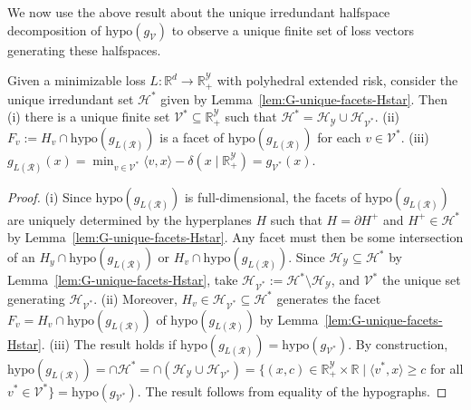 \documentclass[twoside,11pt]{article}
\newcommand{\Comments}{1}
\newcommand{\mynote}[2]{\ifnum\Comments=1\textcolor{#1}{#2}\fi}
\newcommand{\raf}[1]{\mynote{darkgreen}{[RF: #1]}}
\newcommand{\reals}{\mathbb{R}}
\renewcommand{\H}{\mathcal{H}}
\newcommand{\R}{\mathcal{R}}
\newcommand{\V}{\mathcal{V}}
\newcommand{\Y}{\mathcal{Y}}
\newcommand{\inprod}[2]{\langle #1, #2 \rangle}%
\newcommand{\hyp}{\mathrm{hypo}}
\begin{document}
We now use the above result about the unique irredundant halfspace decomposition of $\hyp(g_\V)$ to observe a unique finite set of loss vectors generating these halfspaces.

\begin{corollary}\label{cor:unique-set-loss-vectors-defining-facets}
  Given a minimizable loss $L: \reals^d \to \reals^\Y_+$ with polyhedral extended risk, consider the unique irredundant set $\H^*$ given by Lemma~\ref{lem:G-unique-facets-Hstar}. %
  Then
  (i) there is a unique finite set $\V^* \subseteq \reals^\Y_+$ such that $\H^* = \H_\Y \cup \H_{\V^*}$.
  (ii) $F_v := H_v \cap \hyp(g_{L(\R)})$ is a facet of $\hyp(g_{L(\R)})$ for each $v\in\V^*$.
  (iii) $g_{L(\R)}(x) = \min_{v \in \V^*}\inprod{v}{x} - \delta(x \mid \reals_+^\Y) = g_{\V^*}(x)$.
\end{corollary}
\begin{proof}
%
  (i) Since $\hyp(g_{L(\R)})$ is full-dimensional, the facets of $\hyp(g_{L(\R)})$ are uniquely determined by the hyperplanes $H$ such that $H = \partial H^+$ and $H^+ \in \H^*$ by Lemma~\ref{lem:G-unique-facets-Hstar}.
  Any facet must then be some intersection of an $H_y \cap \hyp(g_{L(\R)})$ or $H_v \cap \hyp(g_{L(\R)})$.
  Since $\H_\Y \subseteq \H^*$ by Lemma~\ref{lem:G-unique-facets-Hstar}, take $\H_{\V^*} := \H^* \setminus \H_{\Y}$, and $\V^*$ the unique set generating $\H_{\V^*}$.
  (ii) Moreover, $H_v \in \H_{\V^*} \subseteq \H^*$ generates the facet $F_v = H_v \cap \hyp(g_{L(\R)})$ of $\hyp(g_{L(\R)})$ by Lemma~\ref{lem:G-unique-facets-Hstar}.
%
  (iii)   The result holds if $\hyp(g_{L(\R)}) = \hyp(g_{\V^*})$.
  By construction, $\hyp(g_{L(\R)}) = \cap \H^* = \cap (\H_\Y \cup \H_{\V^*}) = \{(x,c) \in \reals_+^\Y \times \reals \mid \inprod{v^*}{x} \geq c$ for all $v^* \in \V^* \} = \hyp(g_{\V^*})$.
  The result follows from equality of the hypographs.
\end{proof}
\end{document}
